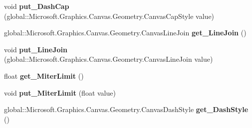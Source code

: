 \begin{DoxyCompactItemize}
\item 
\mbox{\label{class_microsoft_1_1_graphics_1_1_canvas_1_1_geometry_1_1_canvas_stroke_style_af6dd55589d9a2841f19982e1102a37a3}} 
void {\bfseries put\+\_\+\+Dash\+Cap} (global\+::\+Microsoft.\+Graphics.\+Canvas.\+Geometry.\+Canvas\+Cap\+Style value)
\item 
\mbox{\label{class_microsoft_1_1_graphics_1_1_canvas_1_1_geometry_1_1_canvas_stroke_style_af2b4659e4328e98df4216b6cfc29404c}} 
global\+::\+Microsoft.\+Graphics.\+Canvas.\+Geometry.\+Canvas\+Line\+Join {\bfseries get\+\_\+\+Line\+Join} ()
\item 
\mbox{\label{class_microsoft_1_1_graphics_1_1_canvas_1_1_geometry_1_1_canvas_stroke_style_a112f794308a583b16c6b52a845430a94}} 
void {\bfseries put\+\_\+\+Line\+Join} (global\+::\+Microsoft.\+Graphics.\+Canvas.\+Geometry.\+Canvas\+Line\+Join value)
\item 
\mbox{\label{class_microsoft_1_1_graphics_1_1_canvas_1_1_geometry_1_1_canvas_stroke_style_a999cba5c52b4a29dc17175ce7f226aec}} 
float {\bfseries get\+\_\+\+Miter\+Limit} ()
\item 
\mbox{\label{class_microsoft_1_1_graphics_1_1_canvas_1_1_geometry_1_1_canvas_stroke_style_ad0733f31456bf9ae960760a481eb54a5}} 
void {\bfseries put\+\_\+\+Miter\+Limit} (float value)
\item 
\mbox{\label{class_microsoft_1_1_graphics_1_1_canvas_1_1_geometry_1_1_canvas_stroke_style_ab7a77fa7925c62bfceb8ec4a9ffed0a2}} 
global\+::\+Microsoft.\+Graphics.\+Canvas.\+Geometry.\+Canvas\+Dash\+Style {\bfseries get\+\_\+\+Dash\+Style} ()
\item 
\mbox{\label{class_microsoft_1_1_graphics_1_1_canvas_1_1_geometry_1_1_canvas_stroke_style_a58b2ea381cdec6b425c64655ffe06924}} 

\end{DoxyCompactItemize}
